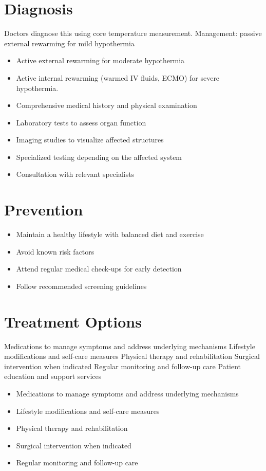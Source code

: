 \section{Diagnosis}
Doctors diagnose this using core temperature measurement. Management: passive external rewarming for mild hypothermia

\begin{itemize}[noitemsep]
  \item Active external rewarming for moderate hypothermia
  \item Active internal rewarming (warmed IV fluids, ECMO) for severe hypothermia.
  \item Comprehensive medical history and physical examination
  \item Laboratory tests to assess organ function
  \item Imaging studies to visualize affected structures
  \item Specialized testing depending on the affected system
  \item Consultation with relevant specialists
\end{itemize}
\section{Prevention}
\begin{itemize}[noitemsep]
  \item Maintain a healthy lifestyle with balanced diet and exercise
  \item Avoid known risk factors
  \item Attend regular medical check-ups for early detection
  \item Follow recommended screening guidelines
\end{itemize}
\section{Treatment Options}
Medications to manage symptoms and address underlying mechanisms Lifestyle modifications and self-care measures Physical therapy and rehabilitation Surgical intervention when indicated Regular monitoring and follow-up care Patient education and support services

\begin{itemize}[noitemsep]
  \item Medications to manage symptoms and address underlying mechanisms
  \item Lifestyle modifications and self-care measures
  \item Physical therapy and rehabilitation
  \item Surgical intervention when indicated
  \item Regular monitoring and follow-up care
\end{itemize}
